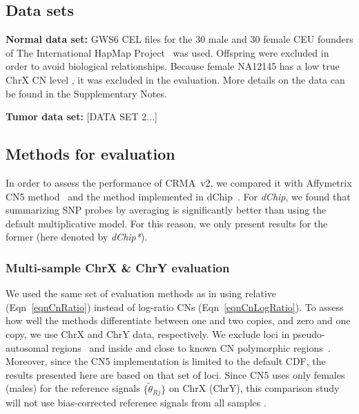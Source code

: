 \documentclass{bioinfo}
\newcommand{\GWSFive}{GWS5\xspace}
\newcommand{\GWSSix}{GWS6\xspace}
\newcommand{\chrX}{ChrX\xspace}
\begin{document}
\subsection{Data sets}
\textbf{Normal data set:} 
\GWSSix CEL files for the 30 male and 30 female CEU founders of The International HapMap Project~\citep{HapMap_2003, AltshulerD_etal_2005} was used. Offspring were excluded in order to avoid biological relationships.
Because female NA12145 has a low true \chrX CN level \citep{TingJ_etal_2006}, it was excluded in the evaluation.  
More details on the data can be found in the Supplementary Notes.

\textbf{Tumor data set:} 
[DATA SET 2...]


\subsection{Methods for evaluation}
\label{secEvaluation}
In order to assess the performance of CRMA~v2, we compared it with Affymetrix CN5 method~\citep{Affymetrix_2008m} and the method implemented in dChip~\citep{LiWong_2001}.  For \emph{dChip}, we found that summarizing SNP probes by averaging is significantly better than using the default multiplicative model.  For this reason, we only present results for the former (here denoted by \emph{dChip*}).  
\subsubsection{Multi-sample ChrX \& ChrY evaluation}
We used the same set of evaluation methods as in \citet{BengtssonH_etal_2008} using relative (Eqn~\eqref{eqnCnRatio}) instead of log-ratio CNs (Eqn~\eqref{eqnCnLogRatio}).
To assess how well the methods differentiate between one and two copies, and zero and one copy, we use ChrX and ChrY data, respectively.  We exclude loci in pseudo-autosomal regions~\citep{BlaschkeRappold_2006} and inside and close to known CN polymorphic regions~\citep{RedonR_etal_2006}.  Moreover, since the CN5 implementation is limited to the default CDF, the results presented here are based on that set of loci.  
Since CN5 uses only females (males) for the reference signals $\{\tilde\theta_{Rj}\}$ on ChrX (ChrY), this comparison study will not use bias-corrected reference signals from all samples \citep{BengtssonH_etal_2008}.
\end{document}

